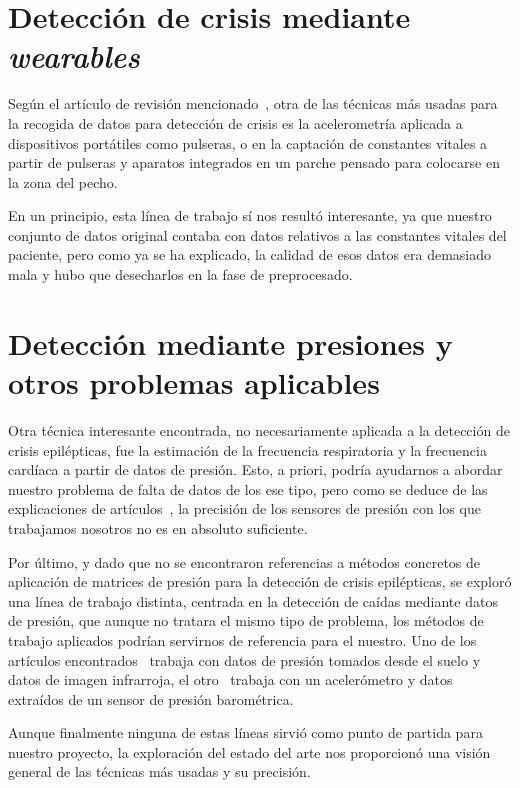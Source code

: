 \section{Detección de crisis mediante \textit{wearables}}

Según el artículo de revisión mencionado~\cite{ramgopal2014epilepsy}, otra de las técnicas más usadas para la recogida de datos para detección de crisis es la acelerometría aplicada a dispositivos portátiles como pulseras, o en la captación de constantes vitales a partir de pulseras y aparatos integrados en un parche pensado para colocarse en la zona del pecho. 

En un principio, esta línea de trabajo sí nos resultó interesante, ya que nuestro conjunto de datos original contaba con datos relativos a las constantes vitales del paciente, pero como ya se ha explicado, la calidad de esos datos era demasiado mala y hubo que desecharlos en la fase de preprocesado. 

\section{Detección mediante presiones y otros problemas aplicables}

Otra técnica interesante encontrada, no necesariamente aplicada a la detección de crisis epilépticas, fue la estimación de la frecuencia respiratoria y la frecuencia cardíaca a partir de datos de presión. Esto, a priori, podría ayudarnos a abordar nuestro problema de falta de datos de los ese tipo, pero como se deduce de las explicaciones de artículos~\cite{kortelainen2012, guerreromora2012}, la precisión de los sensores de presión con los que trabajamos nosotros no es en absoluto suficiente. 

Por último, y dado que no se encontraron referencias a métodos concretos de aplicación de matrices de presión para la detección de crisis epilépticas, se exploró una línea de trabajo distinta, centrada en la detección de caídas mediante datos de presión, que aunque no tratara el mismo tipo de problema, los métodos de trabajo aplicados podrían servirnos de referencia para el nuestro. Uno de los artículos encontrados~\cite{huanwen2010} trabaja con datos de presión tomados desde el suelo y datos de imagen infrarroja, el otro~\cite{tolkiehn2011} trabaja con un acelerómetro y datos extraídos de un sensor de presión barométrica. 

Aunque finalmente ninguna de estas líneas sirvió como punto de partida para nuestro proyecto, la exploración del estado del arte nos proporcionó una visión general de las técnicas más usadas y su precisión. 


